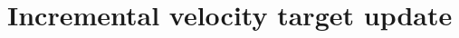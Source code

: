 \documentclass{article} %
\begin{document}

\section{Incremental velocity target update}
\end{document}
